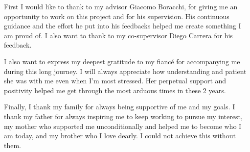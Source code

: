 

\begingroup

First I would like to thank to my advisor Giacomo Boracchi, for giving me an opportunity to work on this 
project and for his supervision. His continuous guidance and the effort he put into his feedbacks helped me create 
something I am proud of. I also want to thank to my co-supervisor Diego Carrera for his feedback.

I also want to express my deepest gratitude to my fianc\'e for accompanying me during this long journey. 
I will always appreciate how understanding and patient she was with me even when I'm most stressed.
Her perpetual support and positivity helped me get through the most arduous times in these 2 years. 

Finally, I thank my family for always being supportive of me and my goals. I thank my father for always 
inspiring me to keep working to pursue my interest, my mother who supported me unconditionally and helped me to 
become who I am today, and my brother who I love dearly. I could not achieve this without them.

\endgroup